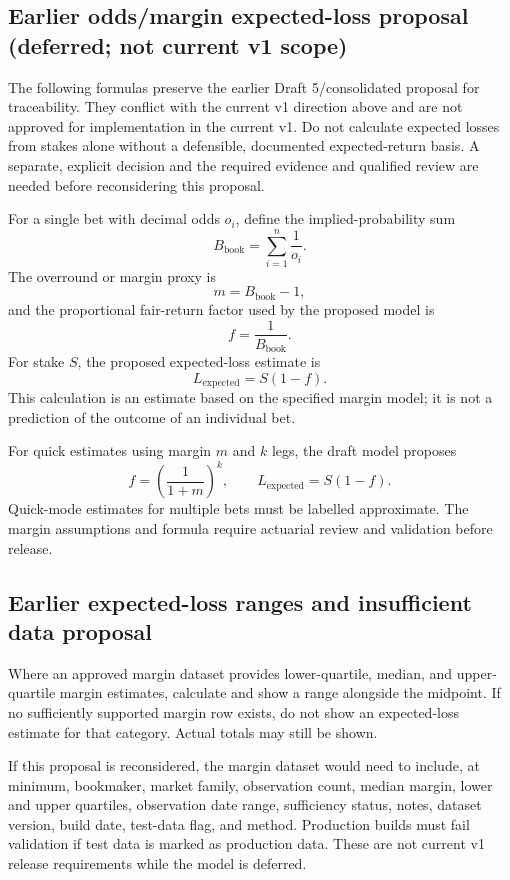 \documentclass[11pt,a4paper]{article}
\begin{document}
\subsection{Earlier odds/margin expected-loss proposal (deferred; not current v1 scope)}
The following formulas preserve the earlier Draft 5/consolidated proposal for traceability. They conflict with the current v1 direction above and are not approved for implementation in the current v1. Do not calculate expected losses from stakes alone without a defensible, documented expected-return basis. A separate, explicit decision and the required evidence and qualified review are needed before reconsidering this proposal.

For a single bet with decimal odds \(o_i\), define the implied-probability sum
\[
B_{\mathrm{book}} = \sum_{i=1}^{n}\frac{1}{o_i}.
\]
The overround or margin proxy is
\[
m = B_{\mathrm{book}} - 1,
\]
and the proportional fair-return factor used by the proposed model is
\[
f = \frac{1}{B_{\mathrm{book}}}.
\]
For stake \(S\), the proposed expected-loss estimate is
\[
L_{\mathrm{expected}} = S(1-f).
\]
This calculation is an estimate based on the specified margin model; it is not a prediction of the outcome of an individual bet.

For quick estimates using margin \(m\) and \(k\) legs, the draft model proposes
\[
f = \left(\frac{1}{1+m}\right)^k,
\qquad
L_{\mathrm{expected}} = S(1-f).
\]
Quick-mode estimates for multiple bets must be labelled approximate. The margin assumptions and formula require actuarial review and validation before release.

\subsection{Earlier expected-loss ranges and insufficient data proposal}
Where an approved margin dataset provides lower-quartile, median, and upper-quartile margin estimates, calculate and show a range alongside the midpoint. If no sufficiently supported margin row exists, do not show an expected-loss estimate for that category. Actual totals may still be shown.

If this proposal is reconsidered, the margin dataset would need to include, at minimum, bookmaker, market family, observation count, median margin, lower and upper quartiles, observation date range, sufficiency status, notes, dataset version, build date, test-data flag, and method. Production builds must fail validation if test data is marked as production data. These are not current v1 release requirements while the model is deferred.
\end{document}
